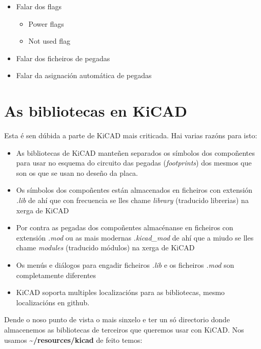 \begin{itemize}
\itemsep1pt\parskip0pt
\item
  Falar dos flags

  \begin{itemize}
  \itemsep1pt\parskip0pt
  \item
    Power flags
  \item
    Not used flag
  \end{itemize}
\item
  Falar dos ficheiros de pegadas
\item
  Falar da asignación automática de pegadas
\end{itemize}

\section{As bibliotecas en KiCAD}\label{as-bibliotecas-en-kicad}

Esta é sen dúbida a parte de KiCAD mais criticada. Hai varias razóns
para isto:

\begin{itemize}
\itemsep1pt\parskip0pt
\item
  As bibliotecas de KiCAD manteñen separados os símbolos dos compoñentes
  para usar no esquema do circuito das pegadas (\emph{footprints}) dos
  mesmos que son os que se usan no deseño da placa.
\item
  Os símbolos dos compoñentes están almacenados en ficheiros con
  extensión \emph{.lib} de ahí que con frecuencia se lles chame
  \emph{library} (traducido librerias) na xerga de KiCAD
\item
  Por contra as pegadas dos compoñentes almacénanse en ficheiros con
  extensión \emph{.mod} ou as mais modernas \emph{.kicad\_mod} de ahí
  que a miudo se lles chame \emph{modules} (traducido módulos) na xerga
  de KiCAD
\item
  Os menús e diálogos para engadir ficheiros \emph{.lib} e os ficheiros
  \emph{.mod} son completamente diferentes
\item
  KiCAD soporta multiples localizacións para as bibliotecas, mesmo
  localizacións en github.
\end{itemize}

Dende o noso punto de vista o mais sinxelo e ter un só directorio donde
almacenemos as bibliotecas de terceiros que queremos usar con KiCAD. Nos
usamos \textbf{\textasciitilde{}/resources/kicad} de feito temos:

